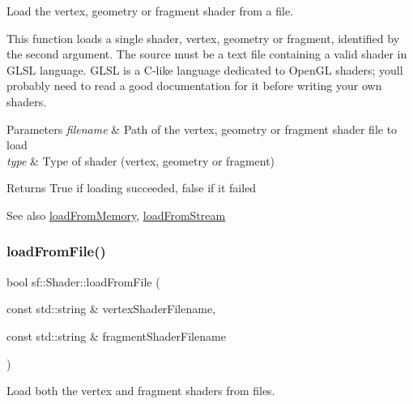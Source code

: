 Load the vertex, geometry or fragment shader from a file. 

This function loads a single shader, vertex, geometry or fragment, identified by the second argument. The source must be a text file containing a valid shader in G\+L\+SL language. G\+L\+SL is a C-\/like language dedicated to Open\+GL shaders; you\textquotesingle{}ll probably need to read a good documentation for it before writing your own shaders.


\begin{DoxyParams}{Parameters}
{\em filename} & Path of the vertex, geometry or fragment shader file to load \\
\hline
{\em type} & Type of shader (vertex, geometry or fragment)\\
\hline
\end{DoxyParams}
\begin{DoxyReturn}{Returns}
True if loading succeeded, false if it failed
\end{DoxyReturn}
\begin{DoxySeeAlso}{See also}
\mbox{\hyperlink{classsf_1_1_shader_ac92d46bf71dff2d791117e4e472148aa}{load\+From\+Memory}}, \mbox{\hyperlink{classsf_1_1_shader_a2ee1b130c0606e4f8bcdf65c1efc2a53}{load\+From\+Stream}} \begin{DoxyVerb}\end{DoxyVerb}
 
\end{DoxySeeAlso}
\mbox{\label{classsf_1_1_shader_ac9d7289966fcef562eeb92271c03e3dc}} 
\subsubsection{\texorpdfstring{loadFromFile()}{loadFromFile()}\hspace{0.1cm}{\footnotesize\ttfamily [2/3]}}
{\footnotesize\ttfamily bool sf\+::\+Shader\+::load\+From\+File (\begin{DoxyParamCaption}\item[{const std\+::string \&}]{vertex\+Shader\+Filename,  }\item[{const std\+::string \&}]{fragment\+Shader\+Filename }\end{DoxyParamCaption})}



Load both the vertex and fragment shaders from files. 

